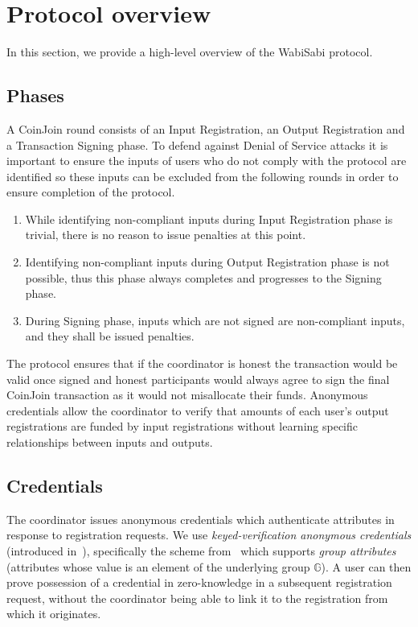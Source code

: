 \documentclass[a4paper]{article}
\begin{document}
\section{Protocol overview} \label{sec:overview}
In this section, we provide a high-level overview of the WabiSabi protocol.
\subsection{Phases}

A CoinJoin round consists of an Input Registration, an Output Registration and a Transaction Signing phase. To defend against Denial of Service attacks it is important to ensure the inputs of users who do not comply with the protocol are identified so these inputs can be excluded from the following rounds in order to ensure completion of the protocol.

\begin{enumerate}
    \item While identifying non-compliant inputs during Input Registration phase is trivial, there is no reason to issue penalties at this point.
    \item Identifying non-compliant inputs during Output Registration phase is not possible, thus this phase always completes and progresses to the Signing phase.
    \item During Signing phase, inputs which are not signed are non-compliant inputs, and they shall be issued penalties.
\end{enumerate}

The protocol ensures that if the coordinator is honest the transaction would be valid once signed and honest participants would always agree to sign the final CoinJoin transaction as it would not misallocate their funds. Anonymous credentials allow the coordinator to verify that amounts of each user's output registrations are funded by input registrations without learning specific relationships between inputs and outputs.

\subsection{Credentials}

The coordinator issues anonymous credentials \cite{brands1993untraceable,brands2000rethinking,baldimtsi2013anonymous} which authenticate attributes in response to registration requests. We use \emph{keyed-verification anonymous credentials} (introduced in~\cite{chase2014algebraic}), specifically the scheme from~\cite{chase2019signal} which supports \emph{group attributes} (attributes whose value is an element of the underlying group $\mathbb{G}$). A user can then prove possession of a credential in zero-knowledge in a subsequent registration request, without the coordinator being able to link it to the registration from which it originates.
\end{document}
